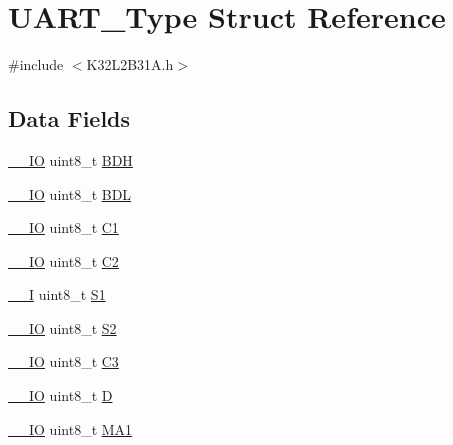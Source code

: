 \hypertarget{struct_u_a_r_t___type}{}\section{U\+A\+R\+T\+\_\+\+Type Struct Reference}
\label{struct_u_a_r_t___type}


{\ttfamily \#include $<$K32\+L2\+B31\+A.\+h$>$}

\subsection*{Data Fields}
\begin{DoxyCompactItemize}
\item 
\mbox{\hyperlink{core__cm0plus_8h_aec43007d9998a0a0e01faede4133d6be}{\+\_\+\+\_\+\+IO}} uint8\+\_\+t \mbox{\hyperlink{struct_u_a_r_t___type_af1f73251625b304407339862ce318059}{B\+DH}}
\item 
\mbox{\hyperlink{core__cm0plus_8h_aec43007d9998a0a0e01faede4133d6be}{\+\_\+\+\_\+\+IO}} uint8\+\_\+t \mbox{\hyperlink{struct_u_a_r_t___type_aca4463c928e7f65eaa324dd97fb6abae}{B\+DL}}
\item 
\mbox{\hyperlink{core__cm0plus_8h_aec43007d9998a0a0e01faede4133d6be}{\+\_\+\+\_\+\+IO}} uint8\+\_\+t \mbox{\hyperlink{struct_u_a_r_t___type_ad54aa92be9fc988e74d55d2d3daae8ad}{C1}}
\item 
\mbox{\hyperlink{core__cm0plus_8h_aec43007d9998a0a0e01faede4133d6be}{\+\_\+\+\_\+\+IO}} uint8\+\_\+t \mbox{\hyperlink{struct_u_a_r_t___type_a4f920936a8fc32483b3ebd9b0674b450}{C2}}
\item 
\mbox{\hyperlink{core__cm0plus_8h_af63697ed9952cc71e1225efe205f6cd3}{\+\_\+\+\_\+I}} uint8\+\_\+t \mbox{\hyperlink{struct_u_a_r_t___type_ac4e320927bd72445c49414603b05f792}{S1}}
\item 
\mbox{\hyperlink{core__cm0plus_8h_aec43007d9998a0a0e01faede4133d6be}{\+\_\+\+\_\+\+IO}} uint8\+\_\+t \mbox{\hyperlink{struct_u_a_r_t___type_aafdaf251d5cfeb18803536542a880459}{S2}}
\item 
\mbox{\hyperlink{core__cm0plus_8h_aec43007d9998a0a0e01faede4133d6be}{\+\_\+\+\_\+\+IO}} uint8\+\_\+t \mbox{\hyperlink{struct_u_a_r_t___type_a6533a725e5ee4892879f0b6d9dd6675a}{C3}}
\item 
\mbox{\hyperlink{core__cm0plus_8h_aec43007d9998a0a0e01faede4133d6be}{\+\_\+\+\_\+\+IO}} uint8\+\_\+t \mbox{\hyperlink{struct_u_a_r_t___type_a6c0edcafd91c3baa698617799de6ec35}{D}}
\item 
\mbox{\hyperlink{core__cm0plus_8h_aec43007d9998a0a0e01faede4133d6be}{\+\_\+\+\_\+\+IO}} uint8\+\_\+t \mbox{\hyperlink{struct_u_a_r_t___type_a87caead6e07d105afdea1716b3f1f152}{M\+A1}}

\end{DoxyCompactItemize}
